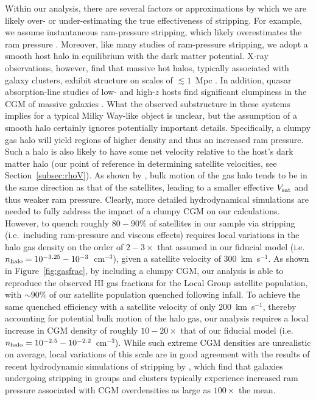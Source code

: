 \documentclass[usenatbib]{mn2e}
\begin{document}
Within our analysis, there are several factors or approximations by
which we are likely over- or under-estimating the true effectiveness
of stripping.
%
For example, we assume instantaneous ram-pressure stripping, which
likely overestimates the ram pressure \citep{tonnesen16}.
%
Moreover, like many studies of ram-pressure stripping, we adopt a
smooth host halo in equilibrium with the dark matter potential. X-ray
observations, however, find that massive hot halos, typically
associated with galaxy clusters, exhibit structure on scales of $\lesssim
1$~Mpc \citep{buote96, schuecker01}.
%
In addition, quasar absorption-line studies of low- and high-$z$ hosts
find significant clumpiness in the CGM of massive galaxies
\citep[e.g.][]{thom12, ab15}.
%
What the observed substructure in these systems implies for a typical
Milky Way-like object is unclear, but the assumption of a smooth halo
certainly ignores potentially important details.
%
Specifically, a clumpy gas halo will yield regions of higher density
and thus an increased ram pressure. Such a halo is also likely to have
some net velocity relative to the host's dark matter halo (our point
of reference in determining satellite velocities, see
Section~\ref{subsec:rhoV}). As shown by \citet{tonnesen08}, bulk
motion of the gas halo tends to be in the same direction as that of
the satellites, leading to a smaller effective $V_{\rm sat}$ and thus
weaker ram pressure.
Clearly, more detailed hydrodynamical simulations are needed to fully
address the impact of a clumpy CGM on our calculations.
%
However, to quench roughly $80-90\%$ of satellites in our sample via
stripping (i.e.~including ram-pressure and viscous effects) requires
local variations in the halo gas density on the order of $2-3\times$
that assumed in our fiducial model (i.e.~$n_{\rm halo} =
10^{-3.25}-10^{-3}$~cm$^{-3}$), given a satellite velocity of
$300$~km~s$^{-1}$. 
%
As shown in Figure~\ref{fig:gasfrac}, by including a clumpy CGM, our
analysis is able to reproduce the observed H{\scriptsize I} gas
fractions for the Local Group satellite population, with $\sim90\%$ of
our satellite population quenched following infall.
%
To achieve the same quenched efficiency with a satellite velocity of
only $200$~km~s$^{-1}$, thereby accounting for potential bulk motion
of the halo gas, our analysis requires a local increase in CGM density
of roughly $10-20\times$ that of our fiducial model (i.e.~$n_{\rm
  halo} = 10^{-2.5}-10^{-2.2}$~cm$^{-3}$).
%
While such extreme CGM densities are unrealistic on average, local
variations of this scale are in good agreement with the results of
recent hydrodynamic simulations of stripping by \citet{bahe15}, which
find that galaxies undergoing stripping in groups and clusters
typically experience increased ram pressure associated with CGM
overdensities as large as $100\times$ the mean.
%
\end{document}
